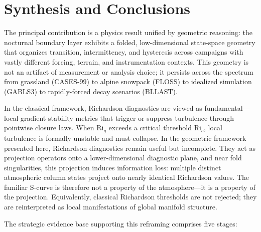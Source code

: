\documentclass[12pt,a4paper]{article}
\newcommand{\Ric}{\mathrm{Ri}_c}
\newcommand{\Rig}{\mathrm{Ri}_g}
\begin{document}
\section{Synthesis and Conclusions}

The principal contribution is a physics result unified by geometric reasoning: the nocturnal boundary layer exhibits a folded, low-dimensional state-space geometry that organizes transition, intermittency, and hysteresis across campaigns with vastly different forcing, terrain, and instrumentation contexts. This geometry is not an artifact of measurement or analysis choice; it persists across the spectrum from grassland (CASES-99) to alpine snowpack (FLOSS) to idealized simulation (GABLS3) to rapidly-forced decay scenarios (BLLAST).

In the classical framework, Richardson diagnostics are viewed as fundamental---local gradient stability metrics that trigger or suppress turbulence through pointwise closure laws. When $\Rig$ exceeds a critical threshold $\Ric$, local turbulence is formally unstable and must collapse. In the geometric framework presented here, Richardson diagnostics remain useful but incomplete. They act as projection operators onto a lower-dimensional diagnostic plane, and near fold singularities, this projection induces information loss: multiple distinct atmospheric column states project onto nearly identical Richardson values. The familiar S-curve is therefore not a property of the atmosphere---it is a property of the projection. Equivalently, classical Richardson thresholds are not rejected; they are reinterpreted as local manifestations of global manifold structure.

The strategic evidence base supporting this reframing comprises five stages:
\end{document}
